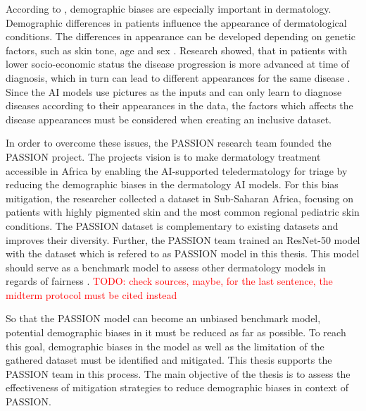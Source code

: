 \documentclass[12pt, a4paper, oneside]{book}   	%
\renewcommand{\todo}[1]{\textcolor{red}{TODO: #1}}
\begin{document}
		According to \textcite{Diaz2022}, demographic biases are especially important in dermatology. Demographic differences in patients influence the appearance of dermatological conditions. The differences in appearance can be developed depending on genetic factors, such as skin tone, age and sex \autocite{Diaz2022}. Research showed, that in patients with lower socio-economic status the disease progression is more advanced at time of diagnosis, which in turn can lead to different appearances for the same disease \autocite{BAD2021}. Since the AI models use pictures as the inputs and can only learn to diagnose diseases according to their appearances in the data, the factors which affects the disease appearances must be considered when creating an inclusive dataset.
		
		In order to overcome these issues, the PASSION research team founded the PASSION project. The projects vision is to make dermatology treatment accessible in Africa by enabling the AI-supported \gls{teledermatology} for triage by reducing the demographic biases in the dermatology AI models. For this bias mitigation, the researcher collected a dataset in Sub-Saharan Africa, focusing on patients with highly pigmented skin and the most common regional \gls{pediatric} skin conditions. The PASSION dataset is complementary to existing datasets and improves their diversity. Further, the PASSION team trained an ResNet-50 model with the dataset which is refered to as PASSION model in this thesis. This model should serve as a benchmark model to assess other dermatology models in regards of fairness \autocite{Gottfrois2024}. \todo{check sources, maybe, for the last sentence, the midterm protocol must be cited instead}
		
		So that the PASSION model can become an unbiased benchmark model, potential demographic biases in it must be reduced as far as possible. To reach this goal, demographic biases in the model as well as the limitation of the gathered dataset must be identified and mitigated. This thesis supports the PASSION team in this process. The main objective of the thesis is to assess the effectiveness of mitigation strategies to reduce demographic biases in context of PASSION.
		
		

		
\end{document}
